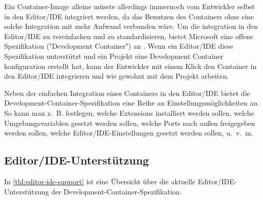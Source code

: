 Ein Container-Image alleine müsste allerdings immernoch vom Entwickler selbst in den Editor/IDE integriert werden, da das Benutzen des Containers ohne eine solche Integration mit mehr Aufwand verbunden wäre. Um die integration in den Editor/IDE zu vereinfachen und zu standardisieren, bietet Microsoft eine offene Spezifikation ("Development Container") an \cite{DevelopmentContainers}. Wenn ein Editor/IDE diese Spezifikation unterstützt und ein Projekt eine Development Container konfiguration erstellt hat, kann der Entwickler mit einem Klick den Container in den Editor/IDE integrieren und wie gewohnt mit dem Projekt arbeiten.

Neben der einfachen Integration eines Containers in den Editor/IDE bietet die Development-Container-Spezifikation eine Reihe an Einstellungsmöglichkeiten an. So kann man z. B. festlegen, welche Extensions installiert werden sollen, welche Umgebungsvariablen gesetzt werden sollen, welche Ports nach außen freigegeben werden sollen, welche Editor/IDE-Einstellungen gesetzt werden sollen, u. v. m.

\pagebreak

\subsection{Editor/IDE-Unterstützung}

In \cref{tbl:editor-ide-support} ist eine Übersicht über die aktuelle Editor/IDE-Unterstützung der Development-Container-Spezifikation.

